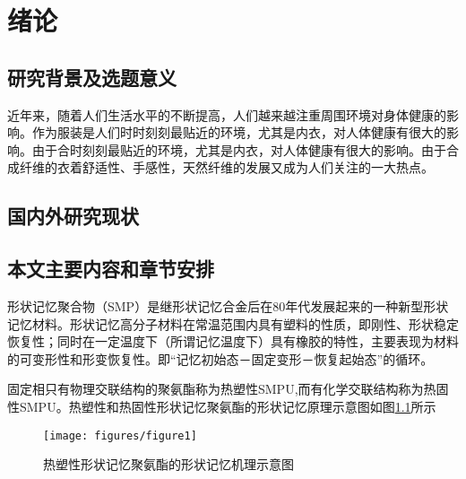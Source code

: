 \chapter{绪论}
\label{chap:intro}
\section{研究背景及选题意义}

近年来，随着人们生活水平的不断提高，人们越来越注重周围环境对身体健康的影响。作为服装是人们时时刻刻最贴近的环境，尤其是内衣，对人体健康有很大的影响。由于合时刻刻最贴近的环境，尤其是内衣，对人体健康有很大的影响。由于合成纤维的衣着舒适性、手感性，天然纤维的发展又成为人们关注的一大热点。

\section{国内外研究现状}

\section{本文主要内容和章节安排}


形状记忆聚合物（SMP）是继形状记忆合金后在80年代发展起来的一种新型形状记忆材料\cite{Jiang2005Size}。形状记忆高分子材料在常温范围内具有塑料的性质，即刚性、形状稳定恢复性；同时在一定温度下（所谓记忆温度下）具有橡胶的特性，主要表现为材料的可变形性和形变恢复性。即“记忆初始态－固定变形－恢复起始态”的循环。

固定相只有物理交联结构的聚氨酯称为热塑性SMPU,而有化学交联结构称为热固性SMPU。热塑性和热固性形状记忆聚氨酯的形状记忆原理示意图如图\ref{fig:diagram}所示

\begin{figure}
 \centering
 \texttt{[image: figures/figure1]}
 \caption{热塑性形状记忆聚氨酯的形状记忆机理示意图}\label{fig:diagram}
\end{figure}


